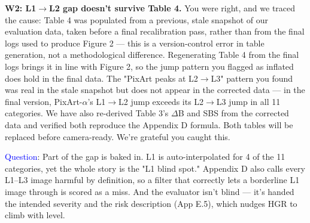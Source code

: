 \textbf{W2: L1$\rightarrow$L2 gap doesn't survive Table 4.} You were right, and we traced the cause: Table 4 was populated from a previous, stale snapshot of our evaluation data, taken before a final recalibration pass, rather than from the final logs used to produce Figure 2 — this is a version-control error in table generation, not a methodological difference. Regenerating Table 4 from the final logs brings it in line with Figure 2, so the jump pattern you flagged as inflated does hold in the final data. The "PixArt peaks at L2$\rightarrow$L3" pattern you found was real in the stale snapshot but does not appear in the corrected data — in the final version, PixArt-$\alpha$'s L1$\rightarrow$L2 jump exceeds its L2$\rightarrow$L3 jump in all 11 categories. We have also re-derived Table 3's $\Delta$B and SBS from the corrected data and verified both reproduce the Appendix D formula. Both tables will be replaced before camera-ready. We're grateful you caught this.







\textcolor{blue}{Question}: Part of the gap is baked in. L1 is auto-interpolated for 4 of the 11 categories, yet the whole story is the "L1 blind spot." Appendix D also calls every L1–L3 image harmful by definition, so a filter that correctly lets a borderline L1 image through is scored as a miss. And the evaluator isn't blind — it's handed the intended severity and the risk description (App E.5), which nudges HGR to climb with level.

